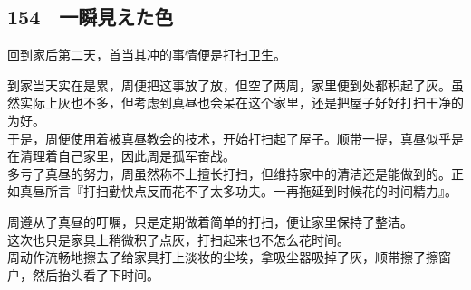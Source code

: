 \subsection{154　一瞬見えた色}

回到家后第二天，首当其冲的事情便是打扫卫生。

到家当天实在是累，周便把这事放了放，但空了两周，家里便到处都积起了灰。虽然实际上灰也不多，但考虑到真昼也会呆在这个家里，还是把屋子好好打扫干净的为好。\\

于是，周便使用着被真昼教会的技术，开始打扫起了屋子。顺带一提，真昼似乎是在清理着自己家里，因此周是孤军奋战。\\

多亏了真昼的努力，周虽然称不上擅长打扫，但维持家中的清洁还是能做到的。正如真昼所言『打扫勤快点反而花不了太多功夫。一再拖延到时候花的时间精力』。

周遵从了真昼的叮嘱，只是定期做着简单的打扫，便让家里保持了整洁。\\

这次也只是家具上稍微积了点灰，打扫起来也不怎么花时间。\\

周动作流畅地擦去了给家具打上淡妆的尘埃，拿吸尘器吸掉了灰，顺带擦了擦窗户，然后抬头看了下时间。\\

